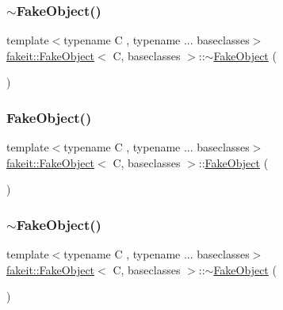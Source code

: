 \subsubsection{\texorpdfstring{$\sim$FakeObject()}{~FakeObject()}\hspace{0.1cm}{\footnotesize\ttfamily [7/9]}}
{\footnotesize\ttfamily template$<$typename C , typename ... baseclasses$>$ \\
\mbox{\hyperlink{classfakeit_1_1FakeObject}{fakeit\+::\+Fake\+Object}}$<$ C, baseclasses $>$\+::$\sim$\mbox{\hyperlink{classfakeit_1_1FakeObject}{Fake\+Object}} (\begin{DoxyParamCaption}{ }\end{DoxyParamCaption})\hspace{0.3cm}{\ttfamily [inline]}}

\mbox{\label{classfakeit_1_1FakeObject_ad705c5388b4354d1fdeef0bdd0151167}} 
\subsubsection{\texorpdfstring{FakeObject()}{FakeObject()}\hspace{0.1cm}{\footnotesize\ttfamily [8/9]}}
{\footnotesize\ttfamily template$<$typename C , typename ... baseclasses$>$ \\
\mbox{\hyperlink{classfakeit_1_1FakeObject}{fakeit\+::\+Fake\+Object}}$<$ C, baseclasses $>$\+::\mbox{\hyperlink{classfakeit_1_1FakeObject}{Fake\+Object}} (\begin{DoxyParamCaption}{ }\end{DoxyParamCaption})\hspace{0.3cm}{\ttfamily [inline]}}

\mbox{\label{classfakeit_1_1FakeObject_abfc9604c62598655fdefcc98a329dbbf}} 
\subsubsection{\texorpdfstring{$\sim$FakeObject()}{~FakeObject()}\hspace{0.1cm}{\footnotesize\ttfamily [8/9]}}
{\footnotesize\ttfamily template$<$typename C , typename ... baseclasses$>$ \\
\mbox{\hyperlink{classfakeit_1_1FakeObject}{fakeit\+::\+Fake\+Object}}$<$ C, baseclasses $>$\+::$\sim$\mbox{\hyperlink{classfakeit_1_1FakeObject}{Fake\+Object}} (\begin{DoxyParamCaption}{ }\end{DoxyParamCaption})\hspace{0.3cm}{\ttfamily [inline]}}

